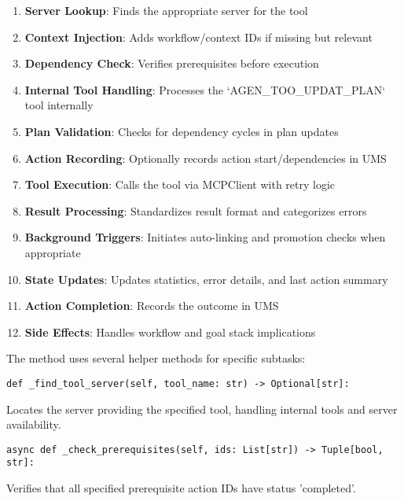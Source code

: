 \documentclass[12pt,a4paper]{article}
\begin{document}
\begin{enumerate}[label=\arabic*.]
    \item \textbf{Server Lookup}: Finds the appropriate server for the tool
    \item \textbf{Context Injection}: Adds workflow/context IDs if missing but relevant
    \item \textbf{Dependency Check}: Verifies prerequisites before execution
    \item \textbf{Internal Tool Handling}: Processes the `AGEN\1\_TOO\1\_UPDAT\1\_PLAN` tool internally
    \item \textbf{Plan Validation}: Checks for dependency cycles in plan updates
    \item \textbf{Action Recording}: Optionally records action start/dependencies in UMS
    \item \textbf{Tool Execution}: Calls the tool via MCPClient with retry logic
    \item \textbf{Result Processing}: Standardizes result format and categorizes errors
    \item \textbf{Background Triggers}: Initiates auto-linking and promotion checks when appropriate
    \item \textbf{State Updates}: Updates statistics, error details, and last action summary
    \item \textbf{Action Completion}: Records the outcome in UMS
    \item \textbf{Side Effects}: Handles workflow and goal stack implications
\end{enumerate}

The method uses several helper methods for specific subtasks:
\begin{pageablecode}
\begin{verbatim}
def _find_tool_server(self, tool_name: str) -> Optional[str]:
\end{verbatim}
\end{pageablecode}
Locates the server providing the specified tool, handling internal tools and server availability.

\begin{pageablecode}
\begin{verbatim}
async def _check_prerequisites(self, ids: List[str]) -> Tuple[bool, str]:
\end{verbatim}
\end{pageablecode}
Verifies that all specified prerequisite action IDs have status 'completed'.
\end{document}
